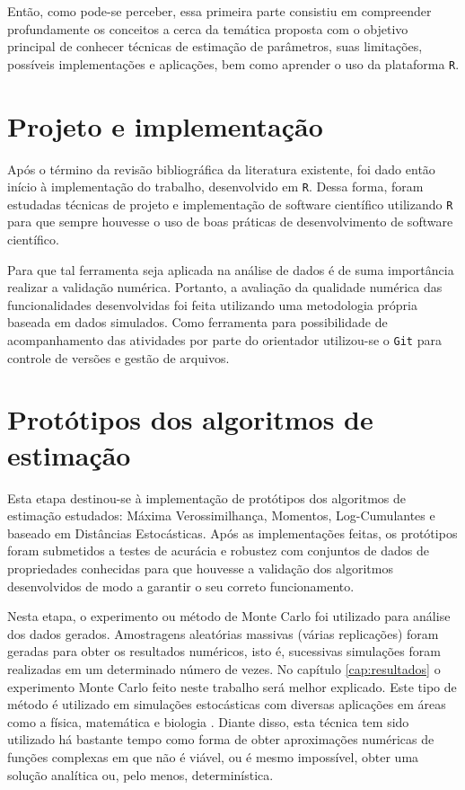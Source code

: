 Então, como pode-se perceber, essa primeira parte consistiu em compreender profundamente os conceitos a cerca da temática proposta com o objetivo principal de conhecer técnicas de estimação de parâmetros, suas limitações, possíveis implementações e aplicações, bem como aprender o uso da plataforma \texttt{R}.

\section{Projeto e implementação}

Após o término da revisão bibliográfica da literatura existente, foi dado então início à implementação do trabalho, desenvolvido em \texttt{R}. Dessa forma, foram estudadas técnicas de projeto e implementação de software científico utilizando \texttt{R} para que sempre houvesse o uso de boas práticas de desenvolvimento de software científico.

Para que tal ferramenta seja aplicada na análise de dados é de suma importância realizar a validação numérica. Portanto, a avaliação da qualidade numérica das funcionalidades desenvolvidas foi feita utilizando uma metodologia própria baseada em dados simulados. Como ferramenta para possibilidade de acompanhamento das atividades por parte do orientador utilizou-se o \texttt{Git} para controle de versões e gestão de arquivos.

\section{Protótipos dos algoritmos de estimação}

Esta etapa destinou-se à implementação de protótipos dos algoritmos de estimação estudados: Máxima Verossimilhança, Momentos, Log-Cumulantes e baseado em Distâncias Estocásticas. Após as implementações feitas, os protótipos foram submetidos a testes de acurácia e robustez com conjuntos de dados de propriedades conhecidas para que houvesse a validação dos algoritmos desenvolvidos de modo a garantir o seu correto funcionamento.

Nesta etapa, o experimento ou método de Monte Carlo foi utilizado para análise dos dados gerados. Amostragens aleatórias massivas (várias replicações) foram geradas para obter os resultados numéricos, isto é, sucessivas simulações foram realizadas em um determinado número de vezes. No capítulo \ref{cap:resultados} o experimento Monte Carlo feito neste trabalho será melhor explicado. Este tipo de método é utilizado em simulações estocásticas com diversas aplicações em áreas como a física, matemática e biologia \citep{busto92}. Diante disso, esta técnica tem sido utilizado há bastante tempo como forma de obter aproximações numéricas de funções complexas em que não é viável, ou é mesmo impossível, obter uma solução analítica ou, pelo menos, determinística.

